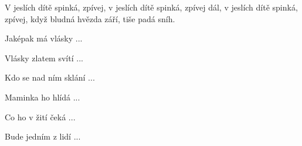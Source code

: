 \vskip-5mm
\IncludeLilypond

V jeslích dítě spinká, zpívej,
v jeslích dítě spinká, zpívej dál,
v jeslích dítě spinká, zpívej,
když bludná hvězda září, tiše padá sníh.

Jaképak má vlásky ...

Vlásky zlatem svítí ...

Kdo se nad ním sklání ...

Maminka ho hlídá ...

Co ho v žití čeká ...

Bude jedním z lidí ...
